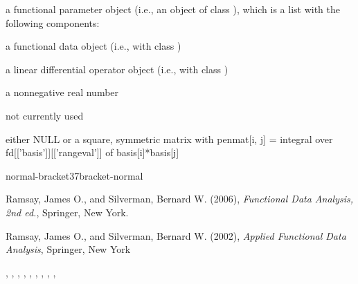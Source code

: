 \begin{Value}
a functional parameter object (i.e., an object of class ),
which is a list with the following components:

\begin{ldescription}
\item[\code{fd}] a functional data object (i.e., with class )

\item[\code{Lfd}] a linear differential operator object (i.e., with class
)

\item[\code{lambda}] a nonnegative real number

\item[\code{estimate}] not currently used
\item[\code{penmat}] either NULL or a square, symmetric matrix with penmat[i, j] =
integral over fd[['basis']][['rangeval']] of basis[i]*basis[j]

\end{ldescription}

normal-bracket37bracket-normal
\end{Value}
\begin{Source}\relax
Ramsay, James O., and Silverman, Bernard W. (2006), \emph{Functional
Data Analysis, 2nd ed.}, Springer, New York.

Ramsay, James O., and Silverman, Bernard W. (2002), \emph{Applied
Functional Data Analysis}, Springer, New York
\end{Source}
\begin{SeeAlso}\relax
{},
,
,
,
,
,
,
,
,
\end{SeeAlso}
